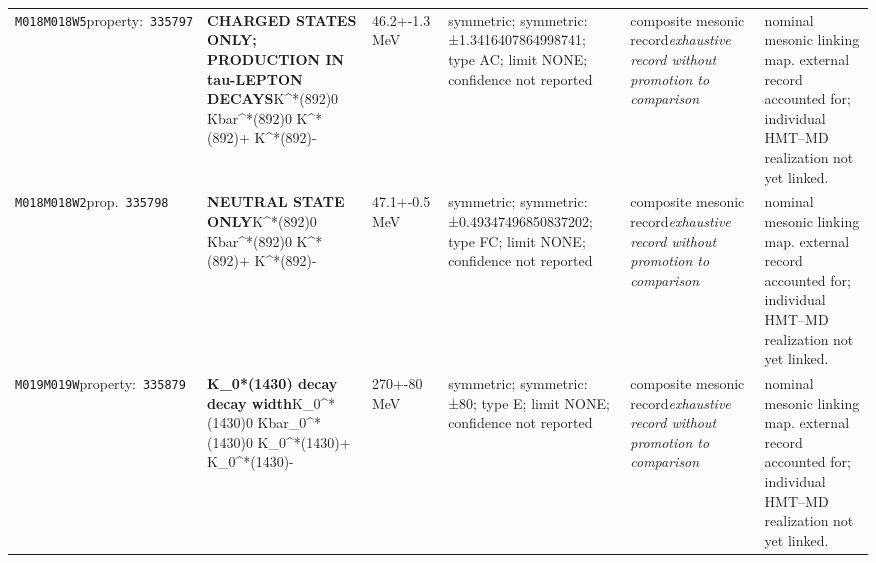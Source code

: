 \begin{landscape}
\begin{longtable}{L{1.85cm}L{4.45cm}L{2.35cm}L{4.05cm}L{3.35cm}L{7.15cm}}
\texttt{M018}\newline \texttt{M018W5}\newline property:\ \texttt{335797} & \textbf{CHARGED STATES ONLY; PRODUCTION IN tau-LEPTON DECAYS}\newline K\textasciicircum{}*(892)0 \textbar{}\allowbreak{} Kbar\textasciicircum{}*(892)0 \textbar{}\allowbreak{} K\textasciicircum{}*(892)+ \textbar{}\allowbreak{} K\textasciicircum{}*(892)- & 46.2+-1.3\,MeV & symmetric; symmetric: ±1.3416407864998741; type AC; limit NONE; confidence not reported & composite mesonic record\newline \emph{exhaustive record without promotion to comparison} & nominal mesonic linking map. external record accounted for; individual HMT--MD realization not yet linked. \\
\texttt{M018}\newline \texttt{M018W2}\newline prop.\ \texttt{335798} & \textbf{NEUTRAL STATE ONLY}\newline K\textasciicircum{}*(892)0 \textbar{}\allowbreak{} Kbar\textasciicircum{}*(892)0 \textbar{}\allowbreak{} K\textasciicircum{}*(892)+ \textbar{}\allowbreak{} K\textasciicircum{}*(892)- & 47.1+-0.5\,MeV & symmetric; symmetric: ±0.49347496850837202; type FC; limit NONE; confidence not reported & composite mesonic record\newline \emph{exhaustive record without promotion to comparison} & nominal mesonic linking map. external record accounted for; individual HMT--MD realization not yet linked. \\
\texttt{M019}\newline \texttt{M019W}\newline property:\ \texttt{335879} & \textbf{K\_\allowbreak{}0*(1430) decay decay width}\newline K\_\allowbreak{}0\textasciicircum{}*(1430)0 \textbar{}\allowbreak{} Kbar\_\allowbreak{}0\textasciicircum{}*(1430)0 \textbar{}\allowbreak{} K\_\allowbreak{}0\textasciicircum{}*(1430)+ \textbar{}\allowbreak{} K\_\allowbreak{}0\textasciicircum{}*(1430)- & 270+-80\,MeV & symmetric; symmetric: ±80; type E; limit NONE; confidence not reported & composite mesonic record\newline \emph{exhaustive record without promotion to comparison} & nominal mesonic linking map. external record accounted for; individual HMT--MD realization not yet linked. \\

\end{longtable}
\end{landscape}
